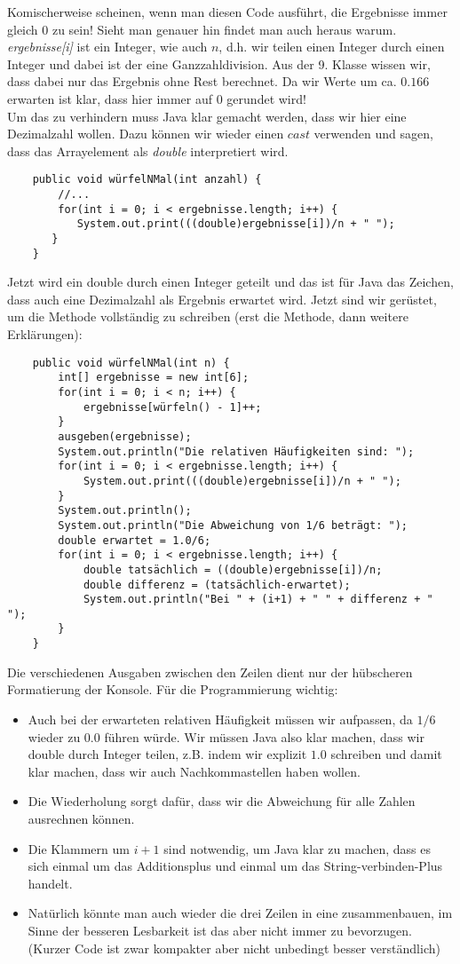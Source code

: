 \documentclass{article}
\begin{document}
Komischerweise scheinen, wenn man diesen Code ausführt, die Ergebnisse immer gleich 0 zu sein! Sieht man genauer hin findet man auch heraus warum. \textit{ergebnisse[i]} ist ein Integer, wie auch $n$, d.h. wir teilen einen Integer durch einen Integer und dabei ist der  eine Ganzzahldivision. Aus der 9. Klasse wissen wir, dass dabei nur das Ergebnis ohne Rest berechnet. Da wir Werte um ca. $0.166$ erwarten ist klar, dass hier immer auf $0$ gerundet wird! \\
Um das zu verhindern muss Java klar gemacht werden, dass wir hier eine Dezimalzahl wollen. Dazu können wir wieder einen $cast$ verwenden und sagen, dass das Arrayelement als \textit{double} interpretiert wird. 
\begin{verbatim}
    public void würfelNMal(int anzahl) {
        //...
        for(int i = 0; i < ergebnisse.length; i++) {
           System.out.print(((double)ergebnisse[i])/n + " ");
       }
    }
\end{verbatim}
Jetzt wird ein double durch einen Integer geteilt und das ist für Java das Zeichen, dass auch eine Dezimalzahl als Ergebnis erwartet wird. Jetzt sind wir gerüstet, um die Methode vollständig zu schreiben (erst die Methode, dann weitere Erklärungen):
\begin{verbatim}
    public void würfelNMal(int n) {
        int[] ergebnisse = new int[6];
        for(int i = 0; i < n; i++) {
            ergebnisse[würfeln() - 1]++;
        }
        ausgeben(ergebnisse);
        System.out.println("Die relativen Häufigkeiten sind: ");
        for(int i = 0; i < ergebnisse.length; i++) {
            System.out.print(((double)ergebnisse[i])/n + " ");
        }
        System.out.println();
        System.out.println("Die Abweichung von 1/6 beträgt: ");
        double erwartet = 1.0/6;
        for(int i = 0; i < ergebnisse.length; i++) {
            double tatsächlich = ((double)ergebnisse[i])/n;
            double differenz = (tatsächlich-erwartet);
            System.out.println("Bei " + (i+1) + " " + differenz + " ");
        }
    }
\end{verbatim}
Die verschiedenen Ausgaben zwischen den Zeilen dient nur der hübscheren Formatierung der Konsole. Für die Programmierung wichtig:
\begin{itemize}
    \item Auch bei der erwarteten relativen Häufigkeit müssen wir aufpassen, da $1/6$ wieder zu $0.0$ führen würde. Wir müssen Java also klar machen, dass wir double durch Integer teilen, z.B. indem wir explizit $1.0$ schreiben und damit klar machen, dass wir auch Nachkommastellen haben wollen.
    \item Die Wiederholung sorgt dafür, dass wir die Abweichung für alle Zahlen ausrechnen können.
    \item Die Klammern um $i+1$ sind notwendig, um Java klar zu machen, dass es sich einmal um das Additionsplus und einmal um das String-verbinden-Plus handelt.  
    \item Natürlich könnte man auch wieder die drei Zeilen in eine zusammenbauen, im Sinne der besseren Lesbarkeit ist das aber nicht immer zu bevorzugen. (Kurzer Code ist zwar kompakter aber nicht unbedingt besser verständlich)
\end{itemize}
\end{document}
